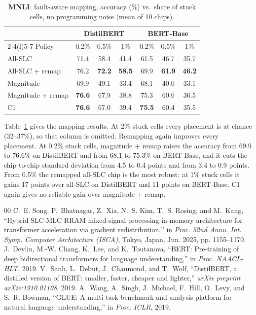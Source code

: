 \documentclass[conference]{IEEEtran}
\begin{document}
\begin{table}[t]
\caption{\textbf{MNLI}: fault-aware mapping, accuracy (\%) vs.\ share of stuck cells, no programming noise
(mean of 10 chips).}
\label{tab:mnli_remap}
\centering
\small
\begin{tabular}{@{}lcccccc@{}}
\toprule
 & \multicolumn{3}{c}{\textbf{DistilBERT}} & \multicolumn{3}{c}{\textbf{BERT-Base}} \\
\cmidrule(lr){2-4}\cmidrule(l){5-7}
Policy & 0.2\% & 0.5\% & 1\% & 0.2\% & 0.5\% & 1\% \\
\midrule
All-SLC           & 71.4 & 58.4 & 41.4 & 61.5 & 46.7 & 35.7 \\
All-SLC + remap   & 76.2 & \textbf{72.2} & \textbf{58.5} & 69.9 & \textbf{61.9} & \textbf{46.2} \\
Magnitude         & 69.9 & 49.1 & 33.4 & 68.1 & 40.0 & 33.1 \\
Magnitude + remap & \textbf{76.6} & 67.9 & 38.8 & 75.3 & 60.0 & 36.5 \\
C1                & \textbf{76.6} & 67.0 & 39.4 & \textbf{75.5} & 60.4 & 35.5 \\
\bottomrule
\end{tabular}
\end{table}

Table~\ref{tab:mnli_remap} gives the mapping results. At 2\% stuck cells every placement is at chance
(32--37\%), so that column is omitted. Remapping again improves every placement. At 0.2\% stuck cells,
magnitude + remap raises the accuracy from 69.9 to 76.6\% on DistilBERT and from 68.1 to 75.3\% on
BERT-Base, and it cuts the chip-to-chip standard deviation from 4.5 to 0.4 points and from 3.4 to 0.9
points. From 0.5\% the remapped all-SLC chip is the most robust: at 1\% stuck cells it gains 17 points over
all-SLC on DistilBERT and 11 points on BERT-Base. C1 again gives no reliable gain over magnitude + remap.


\begin{thebibliography}{00}
 C.~E. Song, P.~Bhatnagar, Z.~Xia, N.~S. Kim, T.~S. Rosing, and M.~Kang,
``Hybrid SLC-MLC RRAM mixed-signal processing-in-memory architecture for transformer acceleration via
gradient redistribution,'' in \emph{Proc. 52nd Annu. Int. Symp. Computer Architecture (ISCA)}, Tokyo,
Japan, Jun. 2025, pp. 1155--1170.
 J.~Devlin, M.-W. Chang, K.~Lee, and K.~Toutanova, ``BERT: Pre-training of deep
bidirectional transformers for language understanding,'' in \emph{Proc. NAACL-HLT}, 2019.
 V.~Sanh, L.~Debut, J.~Chaumond, and T.~Wolf, ``DistilBERT, a distilled version of
BERT: smaller, faster, cheaper and lighter,'' \emph{arXiv preprint arXiv:1910.01108}, 2019.
 A.~Wang, A.~Singh, J.~Michael, F.~Hill, O.~Levy, and S.~R. Bowman, ``GLUE: A
multi-task benchmark and analysis platform for natural language understanding,'' in \emph{Proc. ICLR}, 2019.
\end{thebibliography}
\end{document}
